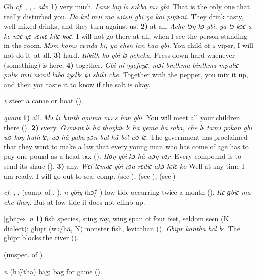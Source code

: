 \begin{letter}{Gb}
 \textit{cf}: , , . \textit{adv} \textbf{1)} very much. \textit{Lanɛ laŋ la sɔkba mɔ gbi.} That is the only one that really disturbed you. \textit{Ŋa kul mɔi ma sɔisɔi gbi ŋa koi piŋiɛni.} They drink tasty, well-mixed drinks, and they turn against us. \textbf{2)} at all. \textit{Ache lɔŋ kɔ gbi, ya lɔ kɔɛ a ke nɔɛ yɛ sɛmɛ kilɛ koɛ.} I will not go there at all, when I see the person standing in the room. \textit{Mɔm komɔ rɛmda ki, ya chen lan haa gbi.} You child of a viper, I will not do it--at all. \textbf{3)} hard. \textit{Kikith ko gbi lɔ ŋcheka.} Press down hard whenever (something) is here. \textbf{4)} together. \textit{Gbi ni ŋgefeyɛ, mɔi binthma-binthma mpuliɛ-puliɛ mɔi nɛmil labo iyɛllɛ ŋɔ shilɔ che.} Together with the pepper, you mix it up, and then you taste it to know if the salt is okay.

 \textit{v} steer a canoe or boat (\citealt{Pichl1967}). 

 \textit{quant} \textbf{1)} all. \textit{Mɔ lɔ bɔnth apuma mɔ ɛ han gbi}. You will meet all your children there (\citealt{Pichl1967}). \textbf{2)} every. \textit{Gɔmɛnt lɛ hã thoŋkiɛ lɛ hã yema hã saba, che lɛ tamɔ pokan gbi wɔ koŋ huth lɛ, wɔ hã paka pɔn bul hã bol wɔ lɛ.} The government has proclaimed that they want to make a law that every young man who has come of age has to pay one pound as a head-tax (\citealt{Pichl1967}). \textit{Ho̹ŋ gbi kɔ hã wɔŋ ve̹r.} Every compound is to send its share (\citealt{Pichl1967}). \textbf{3)} any. \textit{Wɛl tɛmdɛ gbi ŋɔa rɛdiɛ akɔ hɛlɛ ko} Well at any time I am ready, I will go out to sea. comp.  (see ),  (see ),  (see ) 

 \textit{cf}: , ,  (comp. of , ). \textit{n} \textit{gbiy} (hɔ̃/-) low tide occurring twice a month (\citealt{Pichl1967}). \textit{Kɛ ɡbiɛ ma che thaŋ.} But at low tide it does not climb up.

 [gbiipɝ] \textit{n} \textbf{1)} fish species, sting ray, wing span of four feet, seldom seen (K dialect); gbïpr (wɔ/hã, N) monster fish, leviathan (\citealt{Pichl1967}). \textit{Gbïpr kantha hal lɛ.} The gbïpr blocks the river (\citealt{Pichl1967}). 

 (unspec. of )

 \textit{n} (hɔ̃/tha) bag; bag for game (\citealt{Pichl1967}). 


\end{letter}
